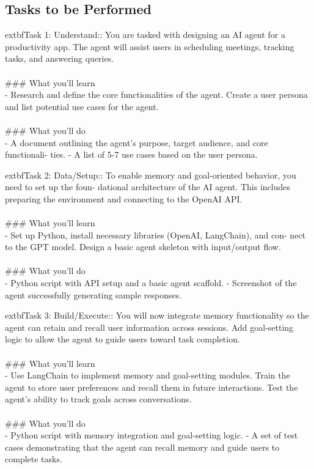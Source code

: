 \documentclass{article}
\begin{document}
\subsection*{Tasks to be Performed}
	extbf{Task 1:} Understand:: You are tasked with designing an AI agent for a productivity app. The agent will assist users in scheduling meetings, tracking tasks, and answering queries. \\
 \\
### What you'll learn \\
- Research and define the core functionalities of the agent. Create a user persona and list potential use cases for the agent. \\
 \\
### What you'll do \\
- A document outlining the agent’s purpose, target audience, and core functionali- ties. - A list of 5-7 use cases based on the user persona.

	extbf{Task 2:} Data/Setup:: To enable memory and goal-oriented behavior, you need to set up the foun- dational architecture of the AI agent. This includes preparing the environment and connecting to the OpenAI API. \\
 \\
### What you'll learn \\
- Set up Python, install necessary libraries (OpenAI, LangChain), and con- nect to the GPT model. Design a basic agent skeleton with input/output flow.  \\
 \\
### What you'll do \\
- Python script with API setup and a basic agent scaffold. - Screenshot of the agent successfully generating sample responses.

	extbf{Task 3:} Build/Execute:: You will now integrate memory functionality so the agent can retain and recall user information across sessions. Add goal-setting logic to allow the agent to guide users toward task completion. \\
 \\
### What you'll learn \\
- Use LangChain to implement memory and goal-setting modules. Train the agent to store user preferences and recall them in future interactions. Test the agent’s ability to track goals across conversations. \\
 \\
### What you'll do \\
- Python script with memory integration and goal-setting logic. - A set of test cases demonstrating that the agent can recall memory and guide users to complete tasks.
\end{document}
